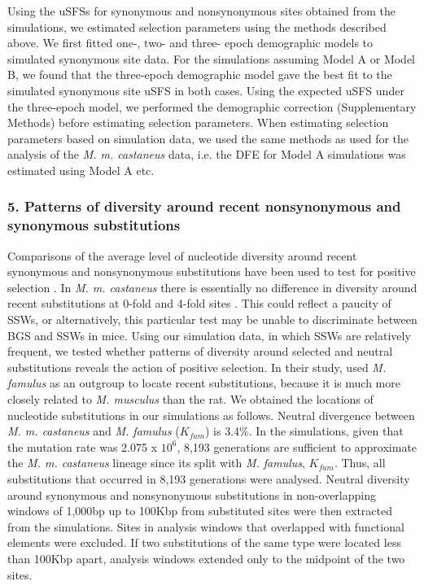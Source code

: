 	Using the uSFSs for synonymous and nonsynonymous sites obtained from the simulations, we estimated selection parameters using the methods described above. We first fitted one-, two- and three- epoch demographic models to simulated synonymous site data. For the simulations assuming Model A or Model B, we found that the three-epoch demographic model gave the best fit to the simulated synonymous site uSFS in both cases. Using the expected uSFS under the three-epoch model, we performed the demographic correction (Supplementary Methods) before estimating selection parameters. When estimating selection parameters based on simulation data, we used the same methods as used for the analysis of the \textit{M. m. castaneus} data, i.e. the DFE for Model A simulations was estimated using Model A etc.

\subsubsection{5. Patterns of diversity around recent nonsynonymous and synonymous substitutions}

	Comparisons of the average level of nucleotide diversity around recent synonymous and nonsynonymous substitutions have been used to test for positive selection 
\citep{RN162,RN167,RN122,RN236,RN230}. In \textit{M. m. castaneus} there is essentially no difference in diversity around recent substitutions at 0-fold and 4-fold sites \citep{RN122}. This could reflect a paucity of SSWs, or alternatively, this particular test may be unable to discriminate between BGS and SSWs in mice. Using our simulation data, in which SSWs are relatively frequent, we tested whether patterns of diversity around selected and neutral substitutions reveals the action of positive selection. In their study, \cite{RN122} used \textit{M. famulus} as an outgroup to locate recent substitutions, because it is much more closely related to \textit{M. musculus} than the rat. We obtained the locations of nucleotide substitutions in our simulations as follows. Neutral divergence between \textit{M. m. castaneus} and \textit{M. famulus} ($K_{fam}$) is 3.4\%. In the simulations, given that the mutation rate was 2.075 x $10^6$, 8,193 generations are sufficient to approximate the \textit{M. m. castaneus} lineage since its split with \textit{M. famulus}, $K_{fam}$. Thus, all substitutions that occurred in 8,193 generations were analysed. Neutral diversity around synonymous and nonsynonymous substitutions in non-overlapping windows of 1,000bp up to 100Kbp from substituted sites were then extracted from the simulations. Sites in analysis windows that overlapped with functional elements were excluded. If two substitutions of the same type were located less than 100Kbp apart, analysis windows extended only to the midpoint of the two sites.
 

